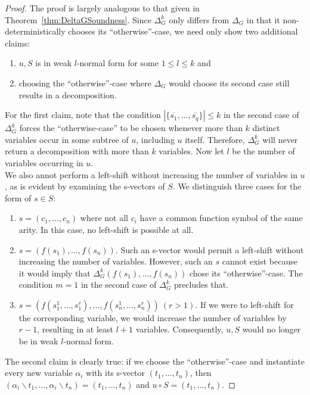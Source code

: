 \documentclass[a4paper, 11pt]{report}
\begin{document}
\begin{proof}
The proof is largely analogous to that given in Theorem~\ref{thm:DeltaGSoundness}. Since $\Delta_G^k$ only differs from $\Delta_G$ in that it non-deterministically chooses its ``otherwise''-case, we need only show two additional claims:

\begin{enumerate}
  \item $u,S$ is in weak $l$-normal form for some $1 \leq l \leq k$ and
  \item choosing the ``otherwise''-case where $\Delta_G$ would choose its second case still results in a decomposition.
\end{enumerate}

For the first claim, note that the condition $|\{\overline{s_1},\dots,\overline{s_q}\}| \leq k$ in the second case of $\Delta_G^k$ forces the ``otherwise-case'' to be chosen whenever more than $k$ distinct variables occur in some subtree of $u$, including $u$ itself. Therefore, $\Delta_G^k$ will never return a decomposition with more than $k$ variables. Now let $l$ be the number of variables occurring in $u$.\\

We also annot perform a left-shift without increasing the number of variables in $u$, as is evident by examining the s-vectors of $S$. We distinguish three cases for the form of $s \in S$:
\begin{enumerate}
  \item $s = (c_1,\dots,c_n)$ where not all $c_i$ have a common function symbol of the same arity. In this case, no left-shift is possible at all.
  \item $s = (f(s_1),\dots,f(s_n))$. Such an s-vector would permit a left-shift without increasing the number of variables. However, such an $s$ cannot exist because it would imply that $\Delta_G^k(f(s_1),\dots,f(s_n))$ chose its ``otherwise''-case. The condition $m = 1$ in the second case of $\Delta_G^k$ precludes that.
  \item $s = (f(s_1^1,\dots,s_1^r),\dots,f(s_n^1,\dots,s_n^r))\ (r > 1)$. If we were to left-shift for the corresponding variable, we would increase the number of variables by $r-1$, resulting in at least $l+1$ variables. Consequently, $u,S$ would no longer be in weak $l$-normal form.
\end{enumerate}


The second claim is clearly true: if we choose the ``otherwise''-case and instantiate every new variable $\alpha_i$ with its s-vector $(t_1,\dots,t_n)$, then
$(\alpha_i\backslash t_1, \dots, \alpha_i\backslash t_n)=(t_1,\dots,t_n)$ and $u \circ S = (t_1,\dots,t_n)$.
\end{proof}
\end{document}
